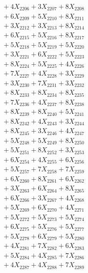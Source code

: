 \documentclass[a4paper,10pt]{article}
\begin{document}
{\begin{align}
&\;  + 4 X_{2206} + 3 X_{2207} + 8 X_{2208} \\[0.3ex]
&\;  + 6 X_{2209} + 5 X_{2210} + 8 X_{2211} \\[0.3ex]
&\;  + 3 X_{2212} + 3 X_{2213} + 8 X_{2214} \\[0.3ex]
&\;  + 6 X_{2215} + 5 X_{2216} + 8 X_{2217} \\[0.3ex]
&\;  + 5 X_{2218} + 5 X_{2219} + 5 X_{2220} \\[0.3ex]
&\;  + 3 X_{2221} + 6 X_{2222} + 5 X_{2223} \\[0.3ex]
&\;  + 8 X_{2224} + 5 X_{2225} + 4 X_{2226} \\[0.3ex]
&\;  + 7 X_{2227} + 4 X_{2228} + 3 X_{2229} \\[0.5ex]\allowbreak
&\;  + 3 X_{2230} + 7 X_{2231} + 3 X_{2232} \\[0.3ex]
&\;  + 8 X_{2233} + 8 X_{2234} + 8 X_{2235} \\[0.3ex]
&\;  + 7 X_{2236} + 4 X_{2237} + 8 X_{2238} \\[0.3ex]
&\;  + 8 X_{2239} + 8 X_{2240} + 5 X_{2241} \\[0.3ex]
&\;  + 8 X_{2242} + 4 X_{2243} + 3 X_{2244} \\[0.3ex]
&\;  + 8 X_{2245} + 3 X_{2246} + 4 X_{2247} \\[0.3ex]
&\;  + 5 X_{2248} + 5 X_{2249} + 8 X_{2250} \\[0.3ex]
&\;  + 5 X_{2251} + 8 X_{2252} + 3 X_{2253} \\[0.3ex]
&\;  + 6 X_{2254} + 4 X_{2255} + 6 X_{2256} \\[0.3ex]
&\;  + 5 X_{2257} + 7 X_{2258} + 7 X_{2259} \\[0.5ex]\allowbreak
&\;  + 6 X_{2260} + 8 X_{2261} + 6 X_{2262} \\[0.3ex]
&\;  + 3 X_{2263} + 6 X_{2264} + 8 X_{2265} \\[0.3ex]
&\;  + 6 X_{2266} + 3 X_{2267} + 4 X_{2268} \\[0.3ex]
&\;  + 5 X_{2269} + 6 X_{2270} + 4 X_{2271} \\[0.3ex]
&\;  + 5 X_{2272} + 5 X_{2273} + 5 X_{2274} \\[0.3ex]
&\;  + 6 X_{2275} + 5 X_{2276} + 5 X_{2277} \\[0.3ex]
&\;  + 5 X_{2278} + 6 X_{2279} + 5 X_{2280} \\[0.3ex]
&\;  + 4 X_{2281} + 7 X_{2282} + 6 X_{2283} \\[0.3ex]
&\;  + 5 X_{2284} + 4 X_{2285} + 7 X_{2286} \\[0.3ex]
&\;  + 4 X_{2287} + 4 X_{2288} + 7 X_{2289} \\[0.5ex]\allowbreak

\end{align}}
\end{document}

